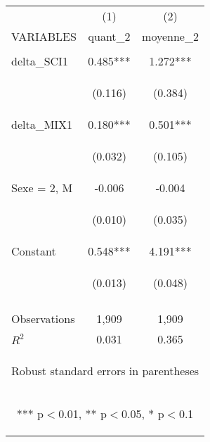 \begin{center}
\begin{tabular}{lcc} \hline
 & (1) & (2) \\
VARIABLES & quant\_2 & moyenne\_2 \\ \hline
\vspace{4pt} & \begin{footnotesize}\end{footnotesize} & \begin{footnotesize}\end{footnotesize} \\
delta\_SCI1 & 0.485*** & 1.272*** \\
\vspace{4pt} & \begin{footnotesize}(0.116)\end{footnotesize} & \begin{footnotesize}(0.384)\end{footnotesize} \\
delta\_MIX1 & 0.180*** & 0.501*** \\
\vspace{4pt} & \begin{footnotesize}(0.032)\end{footnotesize} & \begin{footnotesize}(0.105)\end{footnotesize} \\
Sexe = 2, M & -0.006 & -0.004 \\
\vspace{4pt} & \begin{footnotesize}(0.010)\end{footnotesize} & \begin{footnotesize}(0.035)\end{footnotesize} \\
Constant & 0.548*** & 4.191*** \\
 & \begin{footnotesize}(0.013)\end{footnotesize} & \begin{footnotesize}(0.048)\end{footnotesize} \\
\vspace{4pt} & \begin{footnotesize}\end{footnotesize} & \begin{footnotesize}\end{footnotesize} \\
Observations & 1,909 & 1,909 \\
 $R^2$ & 0.031 & 0.365 \\ \hline
\multicolumn{3}{c}{\begin{footnotesize} Robust standard errors in parentheses\end{footnotesize}} \\
\multicolumn{3}{c}{\begin{footnotesize} *** p$<$0.01, ** p$<$0.05, * p$<$0.1\end{footnotesize}} \\
\end{tabular}
\end{center}
